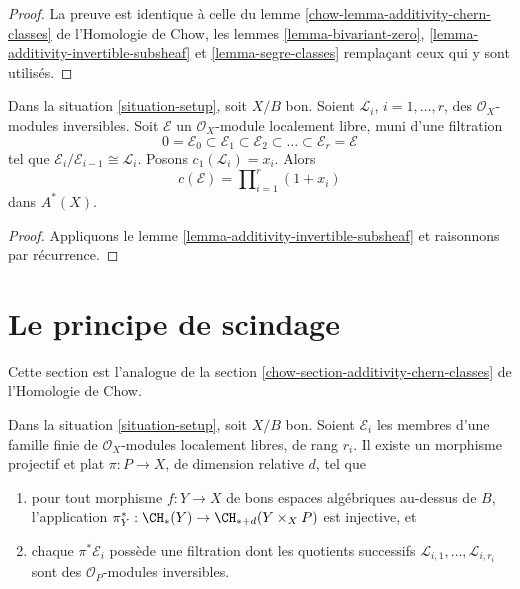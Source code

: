 \begin{proof}
La preuve est identique à celle du lemme
\ref{chow-lemma-additivity-chern-classes} de l'Homologie de Chow, les lemmes
\ref{lemma-bivariant-zero}, \ref{lemma-additivity-invertible-subsheaf} et
\ref{lemma-segre-classes} remplaçant ceux qui y sont utilisés.
\end{proof}

\begin{lemma}
\label{lemma-chern-filter-by-linebundles}
Dans la situation \ref{situation-setup}, soit $X/B$ bon. Soient
${\mathcal L}_i$, $i = 1, \ldots, r$, des $\mathcal{O}_X$-modules inversibles.
Soit $\mathcal{E}$ un $\mathcal{O}_X$-module localement libre, muni d'une
filtration
$$
0 = \mathcal{E}_0 \subset \mathcal{E}_1 \subset \mathcal{E}_2
\subset \ldots \subset \mathcal{E}_r = \mathcal{E}
$$
tel que $\mathcal{E}_i/\mathcal{E}_{i - 1} \cong \mathcal{L}_i$. Posons
$c_1({\mathcal L}_i) = x_i$. Alors
$$
c(\mathcal{E})
=
\prod\nolimits_{i = 1}^r (1 + x_i)
$$
dans $A^*(X)$.
\end{lemma}

\begin{proof}
Appliquons le lemme \ref{lemma-additivity-invertible-subsheaf} et raisonnons
par récurrence.
\end{proof}



















\section{Le principe de scindage}
\label{section-splitting-principle}

\noindent
Cette section est l'analogue de la section
\ref{chow-section-additivity-chern-classes} de l'Homologie de Chow.

\begin{lemma}
\label{lemma-splitting-principle}
Dans la situation \ref{situation-setup}, soit $X/B$ bon. Soient
$\mathcal{E}_i$ les membres d'une famille finie de $\mathcal{O}_X$-modules
localement libres, de rang $r_i$. Il existe un morphisme projectif et plat
$\pi : P \to X$, de dimension relative $d$, tel que
\begin{enumerate}
\item pour tout morphisme $f : Y \to X$ de bons espaces algébriques au-dessus de $B$,
l'application $\pi_Y^* : \CH_*(Y) \to \CH_{* + d}(Y \times_X P)$ est
injective, et
\item chaque $\pi^*\mathcal{E}_i$ possède une filtration dont les quotients
successifs $\mathcal{L}_{i, 1}, \ldots, \mathcal{L}_{i, r_i}$ sont des
${\mathcal O}_P$-modules inversibles.
\end{enumerate}
\end{lemma}

